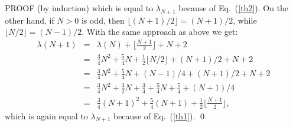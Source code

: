 \documentclass{elsart}
\newcommand{\floor}[1]{{\lfloor{#1}\rfloor}}
\begin{document}
\begin{pf*}{PROOF (by induction)}
which is equal to $\lambda_{N+1}$ because of Eq.~(\ref{th2}). 
On the other hand, if $N>0$ is odd, then $\floor{(N+1)/2}=(N+1)/2$, while
$\floor{N/2}=(N-1)/2$. With the same approach as above we get:
\begin{eqnarray}
\lambda(N+1) &=& \lambda(N) + \floor{\frac{N+1}{2}} + N + 2 \nonumber\\
             &=& \frac34N^2 + \frac54N + \frac12 \floor{N/2} + (N+1)/2 + N + 2 \nonumber\\
             &=& \frac34N^2 + \frac54N + (N-1)/4 + (N+1)/2 + N + 2 \nonumber\\
	     &=& \frac34N^2 + \frac32N + \frac34 + \frac54N + \frac54+ (N+1)/4\nonumber\\
             &=& \frac34(N+1)^2 + \frac54(N+1) + \frac12\floor{\frac{N+1}{2}},\nonumber
\end{eqnarray}
which is again equal to $\lambda_{N+1}$ because of Eq.~(\ref{th1}). 
\qed
\end{pf*}
\end{document}
